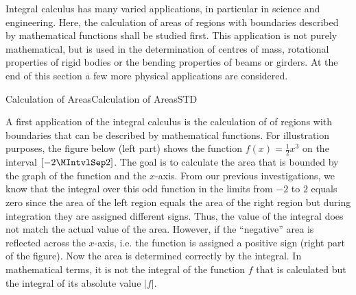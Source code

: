 
\begin{MIntro}
Integral calculus has many varied applications, in particular in science 
and engineering. Here, the calculation of areas of regions with boundaries described by 
mathematical functions shall be studied first. This 
application is not purely mathematical, but is used 
in the determination of centres of mass, rotational properties of rigid bodies or 
the bending properties of beams or girders. At the end of this section 
a few more physical applications are considered.
\end{MIntro}

\begin{MXContent}{Calculation of Areas}{Calculation of Areas}{STD}

A first application of the integral calculus is the calculation 
of  of regions with boundaries that can be described by 
mathematical functions. For illustration purposes, the figure below (left part) shows 
the function $f(x) = \frac{1}{2} x^3$ on the interval $[-2\MIntvlSep 2]$.
The goal is to calculate the area that is bounded by the graph of the 
function and the $x$-axis. From our previous investigations, we know 
that the integral over this odd function in the limits from $-2$ to 
$2$ equals zero since the area of the left region equals the area of the right region 
but during integration they are assigned different signs. Thus, the value of the 
integral does not match the actual value of the area. However, if 
the ``negative'' area is reflected across the $x$-axis, i.e. 
the function is assigned a positive sign (right part of the figure). Now 
the area is determined correctly by the integral. In mathematical terms, 
it is not the integral of the function $f$ that is calculated but the 
integral of its absolute value $\left|f\right|$.


\end{MXContent}
